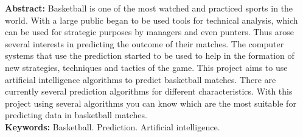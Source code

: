 \begin{singlespace}
\textbf{Abstract: }
Basketball is one of the most watched and practiced sports in the world. With a large public began to be used tools for technical analysis, which can be used for strategic purposes by managers and even punters. Thus arose several interests in predicting the outcome of their matches. The computer systems that use the prediction started to be used to help in the formation of new strategies, techniques and tactics of the game. This project aims to use artificial intelligence algorithms to predict basketball matches. There are currently several prediction algorithms for different characteristics. With this project using several algorithms you can know which are the most suitable for predicting data in basketball matches.\\
\textbf{Keywords: }
Basketball. Prediction. Artificial intelligence.
\end{singlespace}